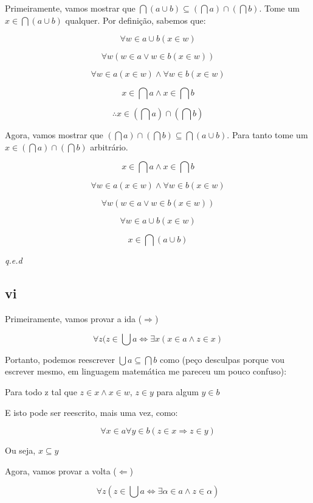 \documentclass[12pt]{extarticle}
\newcommand{\fim}{\begin{flushright}

   \emph{q.e.d}
\end{flushright}}
\begin{document}
Primeiramente, vamos mostrar que $\bigcap (a \cup b) \subseteq (\bigcap a) \cap (\bigcap b)$. Tome um $x \in \bigcap (a \cup b)$ qualquer. Por definição, sabemos que:

$$
\forall w \in a \cup b (x \in w)
$$

$$
\forall w ( w \in a \lor w \in b (x \in w))
$$

$$
\forall w \in a (x \in w) \land \forall w \in b (x \in w)
$$

$$
x \in \bigcap a \land x \in \bigcap b
$$

$$
\therefore x \in (\bigcap a) \cap (\bigcap b)
$$

Agora, vamos mostrar que $(\bigcap a) \cap (\bigcap b) \subseteq \bigcap (a \cup b)$. Para tanto tome um $x \in (\bigcap a) \cap (\bigcap b)$ arbitrário.

$$
x \in \bigcap a \land x \in \bigcap b
$$

$$
\forall w \in a (x \in w) \land \forall w \in b (x \in w)
$$

$$
\forall w (w \in a \lor w \in b (x \in w))
$$

$$
\forall w \in a \cup b (x \in w)
$$

$$
x \in \bigcap (a \cup b)
$$

\fim 

\subsection{vi}

Primeiramente, vamos provar a ida ($\Rightarrow$)

$$\forall z(z \in \bigcup a \Leftrightarrow \exists x (x \in a \land z \in x)$$

Portanto, podemos reescrever $\bigcup a \subseteq \bigcap b$ como (peço desculpas porque vou escrever mesmo, em linguagem matemática me pareceu um pouco confuso):

Para todo z tal que $z \in x \land x \in w$, $z \in y$ para algum $y \in b$

E isto pode ser reescrito, mais uma vez, como:

$$\forall x \in a \forall y \in b (z \in x \Rightarrow z \in y)$$

Ou seja, $x \subseteq y$

Agora, vamos provar a volta ($\Leftarrow$)

\begin{equation}
   \forall z (z \in \bigcup a \Leftrightarrow \exists \alpha \in a \land z \in \alpha) 
\end{equation}
\end{document}
